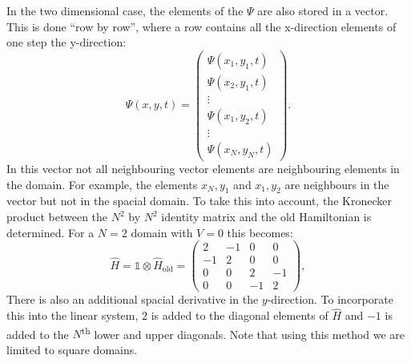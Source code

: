In the two dimensional case, the elements of the $\Psi$ are also stored in a vector. This is done ``row by row'', where a row contains all the x-direction elements of one step the y-direction:
\[
\Psi(x,y,t) =
 \begin{pmatrix}
    \Psi(x_1,y_1,t)     \\
    \Psi(x_2,y_1,t)     \\
    \vdots              \\
    \Psi(x_1,y_2,t)     \\
    \vdots              \\
    \Psi(x_N,y_N,t)
 \end{pmatrix}.
 \] In this vector not all neighbouring vector elements are neighbouring elements in the domain. For example, the elements  $x_N,y_1$ and $x_1,y_2$ are neighbours in the vector but not in the spacial domain. To take this into account, the Kronecker product between the $N^2$ by $N^2$ identity matrix and the old Hamiltonian is determined. For a $N=2$ domain with $V=0$ this becomes:
 \[
\hat{H} = \mathbb{1} \otimes \hat{H}_\text{old} =
 \begin{pmatrix}
    2   & -1    & 0     & 0     \\
    -1  & 2     & 0     & 0     \\
    0   & 0     & 2     & -1    \\
    0   & 0     & -1    & 2
 \end{pmatrix},
 \] There is also an additional spacial derivative in the $y$-direction. To incorporate this into the linear system, $2$ is added to the diagonal elements of $\hat{H}$ and $-1$ is added to the $N$\textsuperscript{th} lower and upper diagonals. Note that using this method we are limited to square domains.